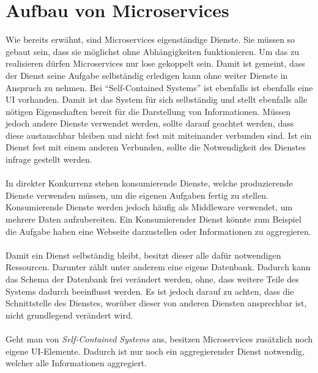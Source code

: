 \section{Aufbau von Microservices}
\label{sec:Aufbau}
Wie bereits erwähnt, sind Microservices eigenständige Dienste. Sie müssen so gebaut sein, dass sie möglichst ohne Abhängigkeiten funktionieren. Um das zu realisieren dürfen Microservices nur lose gekoppelt sein. Damit ist gemeint, dass der Dienst seine Aufgabe selbständig erledigen kann ohne weiter Dienste in Anspruch zu nehmen. Bei "`Self-Contained Systems"' ist ebenfalls ist ebenfalls eine UI vorhanden. Damit ist das System für sich selbständig und stellt ebenfalls alle nötigen Eigenschaften bereit für die Darstellung von Informationen. Müssen jedoch andere Dienste verwendet werden, sollte darauf geachtet werden, dass diese austauschbar bleiben und nicht fest mit miteinander verbunden sind. Ist ein Dienst fest mit einem anderen Verbunden, sollte die Notwendigkeit des Dienstes infrage gestellt werden.
\\\\
In direkter Konkurrenz stehen konsumierende Dienste, welche produzierende Dienste verwenden müssen, um die eigenen Aufgaben fertig zu stellen. Konsumierende Dienste werden jedoch häufig als Middleware verwendet, um mehrere Daten aufzubereiten. Ein Konsumierender Dienst könnte zum Beispiel die Aufgabe haben eine Webseite darzustellen oder Informationen zu aggregieren.
\\\\
Damit ein Dienst selbständig bleibt, besitzt dieser alle dafür notwendigen Ressourcen. Darunter zählt unter anderem eine eigene Datenbank. Dadurch kann das Schema der Datenbank frei verändert werden, ohne, dass weitere Teile des Systems dadurch beeinflusst werden. Es ist jedoch darauf zu achten, dass die Schnittstelle des Dienstes, worüber dieser von anderen Diensten ansprechbar ist, nicht grundlegend verändert wird.
\\\\
Geht man von \textit{Self-Contained Systems} aus, besitzen Microservices zusätzlich noch eigene UI-Elemente. Dadurch ist nur noch ein aggregierender Dienst notwendig, welcher alle Informationen aggregiert.
